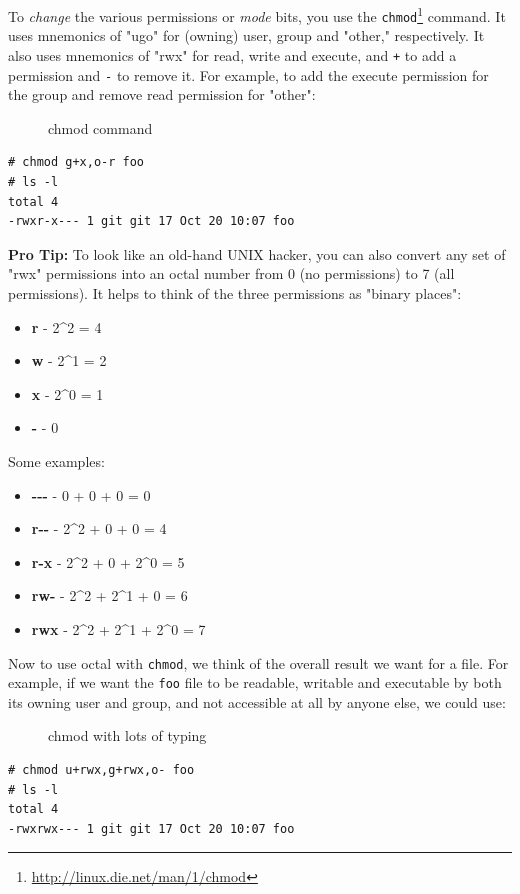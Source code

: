 \documentclass[10pt,]{book}
\renewcommand{\href}[2]{#2\footnote{\url{#1}}}
\numberwithin{figure}{chapter}
\DeclareRobustCommand{\drcap}[1]{\begin{figure}[H]\caption{#1}\end{figure}}
\DeclareRobustCommand{\drcmd}[1]{\index{Commands!#1}}
\begin{document}
To \emph{change} the various permissions or \emph{mode} bits, you use
the \href{http://linux.die.net/man/1/chmod}{\texttt{chmod}}\drcmd{chmod}
command. It uses mnemonics of "ugo" for (owning) user, group and
"other," respectively. It also uses mnemonics of "rwx" for read, write
and execute, and \texttt{+} to add a permission and \texttt{-} to remove
it. For example, to add the execute permission for the group and remove
read permission for "other":

\drcap{chmod command}

\begin{verbatim}
# chmod g+x,o-r foo
# ls -l
total 4
-rwxr-x--- 1 git git 17 Oct 20 10:07 foo
\end{verbatim}

\textbf{Pro Tip:} To look like an old-hand UNIX hacker, you can also
convert any set of "rwx" permissions into an octal number from 0 (no
permissions) to 7 (all permissions). It helps to think of the three
permissions as "binary places":

\begin{itemize}
\itemsep1pt\parskip0pt
\item
  \textbf{r} - 2\^{}2 = 4
\item
  \textbf{w} - 2\^{}1 = 2
\item
  \textbf{x} - 2\^{}0 = 1
\item
  \textbf{-} - 0
\end{itemize}

Some examples:

\begin{itemize}
\itemsep1pt\parskip0pt
\item
  \textbf{-{}-{}-} - 0 + 0 + 0 = 0
\item
  \textbf{r-{}-} - 2\^{}2 + 0 + 0 = 4
\item
  \textbf{r-x} - 2\^{}2 + 0 + 2\^{}0 = 5
\item
  \textbf{rw-} - 2\^{}2 + 2\^{}1 + 0 = 6
\item
  \textbf{rwx} - 2\^{}2 + 2\^{}1 + 2\^{}0 = 7
\end{itemize}

Now to use octal with \texttt{chmod}, we think of the overall result we
want for a file. For example, if we want the \texttt{foo} file to be
readable, writable and executable by both its owning user and group, and
not accessible at all by anyone else, we could use:

\drcap{chmod with lots of typing}

\begin{verbatim}
# chmod u+rwx,g+rwx,o- foo
# ls -l
total 4
-rwxrwx--- 1 git git 17 Oct 20 10:07 foo
\end{verbatim}
\end{document}

